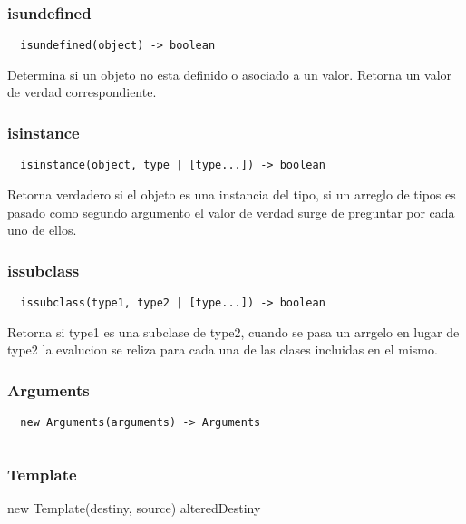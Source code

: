 \subsubsection*{isundefined}
\begin{verbatim}
  isundefined(object) -> boolean
\end{verbatim}
Determina si un objeto no esta definido o asociado a un valor. Retorna un valor
de verdad correspondiente.

\subsubsection*{isinstance}
\begin{verbatim}
  isinstance(object, type | [type...]) -> boolean
\end{verbatim}
Retorna verdadero si el objeto es una instancia del tipo, si un arreglo de tipos
es pasado como segundo argumento el valor de verdad surge de preguntar por cada
uno de ellos.

\subsubsection*{issubclass}
\begin{verbatim}
  issubclass(type1, type2 | [type...]) -> boolean
\end{verbatim}
Retorna si type1 es una subclase de type2, cuando se pasa un arrgelo en lugar de
type2 la evalucion se reliza para cada una de las clases incluidas en el mismo.

\subsubsection*{Arguments}
\begin{verbatim}
  new Arguments(arguments) -> Arguments
\end{verbatim}

\begin{lstlisting}[style=consola]
\end{lstlisting}

\subsubsection*{Template}
new Template(destiny, source) \rightarrow alteredDestiny

